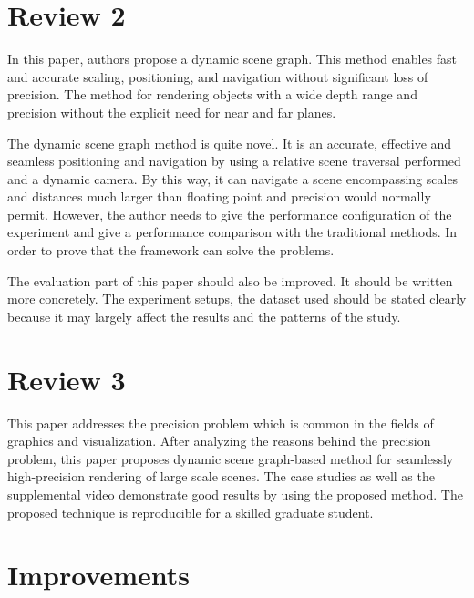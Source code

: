 \documentclass{article}
\begin{document}
\section*{Review 2}

In this paper, authors propose a dynamic scene graph.
This method enables fast and accurate scaling, positioning, and navigation without significant loss of precision.
The method for rendering objects with a wide depth range and precision without the explicit need for near and far planes.
    
The dynamic scene graph method is quite novel.
It is an accurate, effective and seamless positioning and navigation by using a relative scene traversal performed and a dynamic camera.
By this way, it can navigate a scene encompassing scales and distances much larger than floating point and precision would normally permit.
However, the author needs to give the performance configuration of the experiment and give a performance comparison with the traditional methods.
In order to prove that the framework can solve the problems.
    
The evaluation part of this paper should also be improved.
It should be written more concretely.
The experiment setups, the dataset used should be stated clearly because it may largely affect the results and the patterns of the study.

\section*{Review 3}

This paper addresses the precision problem which is common in the fields of graphics and visualization.
After analyzing the reasons behind the precision problem, this paper proposes dynamic scene graph-based method for seamlessly high-precision rendering of large scale scenes.
The case studies as well as the supplemental video demonstrate good results by using the proposed method.
 The proposed technique is reproducible for a skilled graduate student.


\section*{Improvements}


\end{document}
